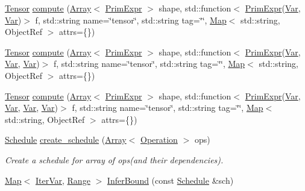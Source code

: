 \begin{DoxyCompactItemize}
\item 
\hyperlink{classtvm_1_1te_1_1Tensor}{Tensor} \hyperlink{namespacetvm_1_1te_a44dae0ad08627ceebe2d0d3f45daa388}{compute} (\hyperlink{classtvm_1_1Array}{Array}$<$ \hyperlink{classtvm_1_1PrimExpr}{Prim\+Expr} $>$ shape, std\+::function$<$ \hyperlink{classtvm_1_1PrimExpr}{Prim\+Expr}(\hyperlink{classtvm_1_1tir_1_1Var}{Var}, \hyperlink{classtvm_1_1tir_1_1Var}{Var})$>$ f, std\+::string name=\char`\"{}tensor\char`\"{}, std\+::string tag=\char`\"{}\char`\"{}, \hyperlink{classtvm_1_1Map}{Map}$<$ std\+::string, Object\+Ref $>$ attrs=\{\})
\item 
\hyperlink{classtvm_1_1te_1_1Tensor}{Tensor} \hyperlink{namespacetvm_1_1te_a37b573ec96a0c47ff16719bcd13d7531}{compute} (\hyperlink{classtvm_1_1Array}{Array}$<$ \hyperlink{classtvm_1_1PrimExpr}{Prim\+Expr} $>$ shape, std\+::function$<$ \hyperlink{classtvm_1_1PrimExpr}{Prim\+Expr}(\hyperlink{classtvm_1_1tir_1_1Var}{Var}, \hyperlink{classtvm_1_1tir_1_1Var}{Var}, \hyperlink{classtvm_1_1tir_1_1Var}{Var})$>$ f, std\+::string name=\char`\"{}tensor\char`\"{}, std\+::string tag=\char`\"{}\char`\"{}, \hyperlink{classtvm_1_1Map}{Map}$<$ std\+::string, Object\+Ref $>$ attrs=\{\})
\item 
\hyperlink{classtvm_1_1te_1_1Tensor}{Tensor} \hyperlink{namespacetvm_1_1te_aaf04658c5295c3ccebaed3f7b824a841}{compute} (\hyperlink{classtvm_1_1Array}{Array}$<$ \hyperlink{classtvm_1_1PrimExpr}{Prim\+Expr} $>$ shape, std\+::function$<$ \hyperlink{classtvm_1_1PrimExpr}{Prim\+Expr}(\hyperlink{classtvm_1_1tir_1_1Var}{Var}, \hyperlink{classtvm_1_1tir_1_1Var}{Var}, \hyperlink{classtvm_1_1tir_1_1Var}{Var}, \hyperlink{classtvm_1_1tir_1_1Var}{Var})$>$ f, std\+::string name=\char`\"{}tensor\char`\"{}, std\+::string tag=\char`\"{}\char`\"{}, \hyperlink{classtvm_1_1Map}{Map}$<$ std\+::string, Object\+Ref $>$ attrs=\{\})
\item 
\hyperlink{classtvm_1_1te_1_1Schedule}{Schedule} \hyperlink{namespacetvm_1_1te_a485034766309df280239e0994913b34b}{create\+\_\+schedule} (\hyperlink{classtvm_1_1Array}{Array}$<$ \hyperlink{classtvm_1_1te_1_1Operation}{Operation} $>$ ops)
\begin{DoxyCompactList}\small\item\em Create a schedule for array of ops(and their dependencies). \end{DoxyCompactList}\item 
\hyperlink{classtvm_1_1Map}{Map}$<$ \hyperlink{classtvm_1_1tir_1_1IterVar}{Iter\+Var}, \hyperlink{classtvm_1_1Range}{Range} $>$ \hyperlink{namespacetvm_1_1te_ac0effd02bbddf8ce2cce7073e175ca4c}{Infer\+Bound} (const \hyperlink{classtvm_1_1te_1_1Schedule}{Schedule} \&sch)

\end{DoxyCompactItemize}
